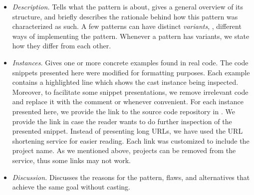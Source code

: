 \begin{itemize}

\item \textit{Description.}
Tells what the pattern is about, gives a general overview of its structure, and
briefly describes the rationale behind how this pattern was characterized as such.
A few patterns can have distinct \emph{variants}, \ie,
different ways of implementing the pattern.
Whenever a pattern has variants,
we state how they differ from each other.

\item \textit{Instances.}
Gives one or more concrete examples found in real code.
The code snippets presented here were modified for formatting purposes.
Each example contains a highlighted line which shows the cast instance being inspected.
Moreover, to facilitate some snippet presentations,
we remove irrelevant code and replace it with the comment
\code{// [...]} or \code{/* [...] */} whenever convenient.
For each instance presented here,
we provide the link to the source code repository in \lgtm{}.
We provide the link in case the reader wants to do further inspection of the presented snippet.
Instead of presenting long \lgtm{} URLs,
we have used the URL shortening service
\href{https://bitly.com/}{\bitly} for easier reading.
Each \bitly{} link was customized to include the project name.
As we mentioned above, projects can be removed from the \lgtm{} service,
thus some links may not work.

\item \textit{Discussion.}
Discusses the reasons for the pattern, flaws, and alternatives that achieve the same goal without casting.

\end{itemize}


\newcommand\urlbox{\null\hfill\colorbox{lightgray}{\scriptsize\url{\urlvar}}}

\newcommand\castpatternsection[1]{\paragraph{#1.}}
\newcommand\variant[1]{\textsl{#1}}
\newenvironment{pattern}[1]{
    \newcommand{\nocc}{\csname n#1Pattern\endcsname{}}
    \newcommand{\noccsrc}{\csname n#1PatternSrc\endcsname{}}
    \newcommand{\noccgen}{\csname n#1PatternGen\endcsname{}}
    \newcommand{\nocctest}{\csname n#1PatternTest\endcsname{}}
    \newcommand{\pocc}{\csname p#1Pattern\endcsname{}}
    \newcommand{\instances}{\castpatternsection{Instances: \nocc{} (\pocc\%)}
    We found \noccsrc{} in application code, \nocctest{} in test code, and \noccgen{} in generated code.}
    \newcommand{\discussion}{\castpatternsection{Discussion}}
    \newcommand{\thisp}{\textsc{#1}}
    \subsection{\textsc{#1}}
    \label{pat:#1}
    \castpatternsection{Description}
}{}

